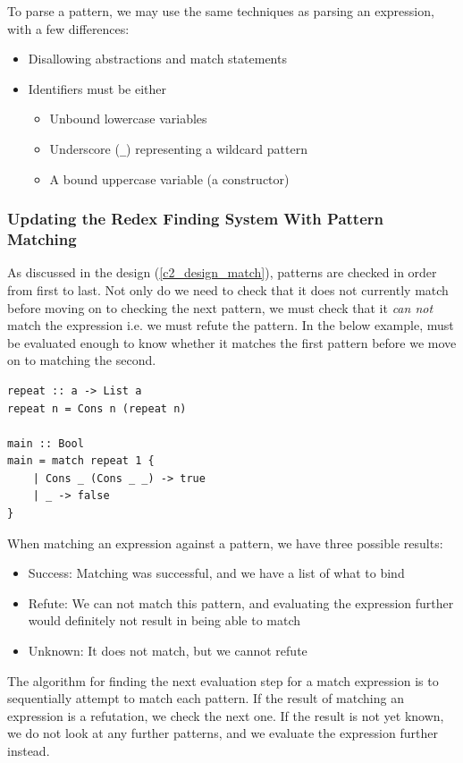 To parse a pattern, we may use the same techniques as parsing an expression, with a few differences:
\begin{itemize}
    \item Disallowing abstractions and match statements
    \item Identifiers must be either
    \begin{itemize}
        \item Unbound lowercase variables
        \item Underscore (\verb|_|) representing a wildcard pattern
        \item A bound uppercase variable (a constructor)
    \end{itemize}
\end{itemize}

\subsubsection{Updating the Redex Finding System With Pattern Matching}
As discussed in the design (\ref{c2_design_match}), patterns are checked in order from first to last. Not only do we need to check that it does not currently match before moving on to checking the next pattern, we must check that it \textit{can not} match the expression i.e. we must refute the pattern. In the below example,  must be evaluated enough to know whether it matches the first pattern before we move on to matching the second. 

\begin{lstlisting}[language=SFL]
repeat :: a -> List a
repeat n = Cons n (repeat n)

main :: Bool
main = match repeat 1 {
    | Cons _ (Cons _ _) -> true
    | _ -> false
}
\end{lstlisting}

When matching an expression against a pattern, we have three possible results:

\begin{itemize}
    \item Success: Matching was successful, and we have a list of what to bind
    \item Refute: We can not match this pattern, and evaluating the expression further would definitely not result in being able to match
    \item Unknown: It does not match, but we cannot refute
\end{itemize}
\noindent The algorithm for finding the next evaluation step for a match expression is to sequentially attempt to match each pattern. If the result of matching an expression is a refutation, we check the next one. If the result is not yet known, we do not look at any further patterns, and we evaluate the expression further instead. 

